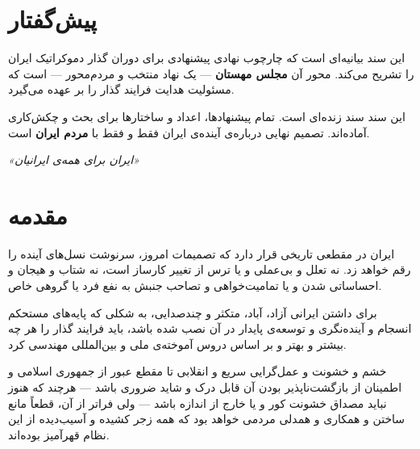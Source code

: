 \documentclass[12pt,a4paper,twoside,openany]{book}
\begin{document}
	\frontmatter
	\pagestyle{plain}
	
	\chapter*{پیش‌گفتار}
	\begin{summarybox}
		این سند بیانیه‌ای است که چارچوب نهادی پیشنهادی برای دوران گذار دموکراتیک ایران را تشریح
		می‌کند. محور آن \textbf{مجلس مهستان} — یک نهاد منتخب و مردم‌محور — است که مسئولیت
		هدایت فرایند گذار را بر عهده می‌گیرد.
		
		این سند سند زنده‌ای است. تمام پیشنهادها، اعداد و ساختارها برای بحث و چکش‌کاری آماده‌اند.
		تصمیم نهایی درباره‌ی آینده‌ی ایران فقط و فقط با \textbf{مردم ایران} است.
	\end{summarybox}
	
	\vspace{1cm}
	\begin{center}
		{\large\color{MahestanDarkBlue}\itshape
			«ایران برای همه‌ی ایرانیان»}
	\end{center}
	
	\tableofcontents
	\cleardoublepage
	
	\mainmatter
	\pagestyle{fancy}
	
	\chapter{مقدمه}
	\label{ch:intro}
	
	ایران در مقطعی تاریخی قرار دارد که تصمیمات امروز، سرنوشت نسل‌های آینده را رقم خواهد
	زد. نه تعلل و بی‌عملی و یا ترس از تغییر کارساز است، نه شتاب و هیجان و احساساتی شدن
	و یا تمامیت‌خواهی و تصاحب جنبش به نفع فرد یا گروهی خاص.
	
	برای داشتن ایرانی آزاد، آباد، متکثر و چندصدایی، به شکلی که پایه‌های مستحکم انسجام
	و آینده‌نگری و توسعه‌ی پایدار در آن نصب شده باشد، باید فرایند گذار را هر چه بیشتر
	و بهتر و بر اساس دروس آموخته‌ی ملی و بین‌المللی مهندسی کرد.
	
	خشم و خشونت و عمل‌گرایی سریع و انقلابی تا مقطع عبور از جمهوری اسلامی و اطمینان از
	بازگشت‌ناپذیر بودن آن قابل درک و شاید ضروری باشد --- هرچند که هنوز نباید مصداق
	خشونت کور و یا خارج از اندازه باشد --- ولی فراتر از آن، قطعاً مانع ساختن و همکاری
	و همدلی مردمی خواهد بود که همه زجر کشیده و آسیب‌دیده از این نظام قهرآمیز بوده‌اند.
	
\end{document}

